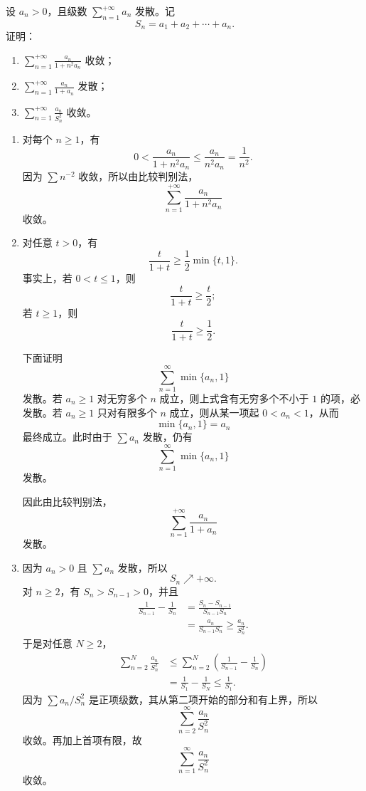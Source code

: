 \begin{question}[15分]
设 $a_n>0$，且级数 $\sum_{n=1}^{+\infty}a_n$ 发散。记
\[
  S_n=a_1+a_2+\cdots+a_n.
\]
证明：
\begin{enumerate}
  \item $\displaystyle \sum_{n=1}^{+\infty}\frac{a_n}{1+n^2a_n}$ 收敛；
  \item $\displaystyle \sum_{n=1}^{+\infty}\frac{a_n}{1+a_n}$ 发散；
  \item $\displaystyle \sum_{n=1}^{+\infty}\frac{a_n}{S_n^2}$ 收敛。
\end{enumerate}
\begin{solution}
\begin{enumerate}
  \item 对每个 $n\ge1$，有
  \[
    0<
    \frac{a_n}{1+n^2a_n}
    \le
    \frac{a_n}{n^2a_n}
    =
    \frac1{n^2}.
  \]
  因为 $\sum n^{-2}$ 收敛，所以由比较判别法，
  \[
    \sum_{n=1}^{+\infty}\frac{a_n}{1+n^2a_n}
  \]
  收敛。

  \item 对任意 $t>0$，有
  \[
    \frac{t}{1+t}\ge \frac12\min\{t,1\}.
  \]
  事实上，若 $0<t\le1$，则
  \[
    \frac{t}{1+t}\ge\frac{t}{2};
  \]
  若 $t\ge1$，则
  \[
    \frac{t}{1+t}\ge\frac12.
  \]

  下面证明
  \[
    \sum_{n=1}^{\infty}\min\{a_n,1\}
  \]
  发散。若 $a_n\ge1$ 对无穷多个 $n$ 成立，则上式含有无穷多个不小于 $1$ 的项，必发散。若 $a_n\ge1$ 只对有限多个 $n$ 成立，则从某一项起 $0<a_n<1$，从而
  \[
    \min\{a_n,1\}=a_n
  \]
  最终成立。此时由于 $\sum a_n$ 发散，仍有
  \[
    \sum_{n=1}^{\infty}\min\{a_n,1\}
  \]
  发散。

  因此由比较判别法，
  \[
    \sum_{n=1}^{+\infty}\frac{a_n}{1+a_n}
  \]
  发散。

  \item 因为 $a_n>0$ 且 $\sum a_n$ 发散，所以
  \[
    S_n\nearrow+\infty.
  \]
  对 $n\ge2$，有 $S_n>S_{n-1}>0$，并且
  \[
\begin{aligned}
    \frac1{S_{n-1}}-\frac1{S_n}
    &=
    \frac{S_n-S_{n-1}}{S_{n-1}S_n}  \\
    &=
    \frac{a_n}{S_{n-1}S_n}
    \ge
    \frac{a_n}{S_n^2}.
\end{aligned}
  \]
  于是对任意 $N\ge2$，
  \[
\begin{aligned}
    \sum_{n=2}^{N}\frac{a_n}{S_n^2}
    &\le
    \sum_{n=2}^{N}
    \left(
      \frac1{S_{n-1}}-\frac1{S_n}
    \right)  \\
    &=
    \frac1{S_1}-\frac1{S_N}
    \le
    \frac1{S_1}.
\end{aligned}
  \]
  因为 $\sum a_n/S_n^2$ 是正项级数，其从第二项开始的部分和有上界，所以
  \[
    \sum_{n=2}^{\infty}\frac{a_n}{S_n^2}
  \]
  收敛。再加上首项有限，故
  \[
    \sum_{n=1}^{\infty}\frac{a_n}{S_n^2}
  \]
  收敛。
\end{enumerate}
\end{solution}
\end{question}
